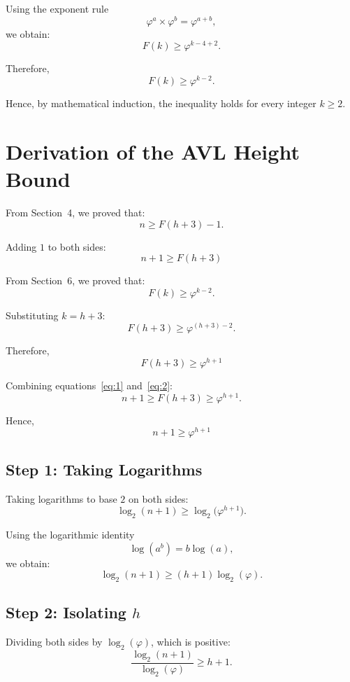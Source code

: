 \documentclass[11pt,a4paper]{article}
\begin{document}
Using the exponent rule
\[
  \varphi^{a} \times \varphi^{b} = \varphi^{a+b},
\]
we obtain:
\[
  F(k) \ge \varphi^{k-4+2}.
\]

Therefore,
\[
  \boxed{F(k) \ge \varphi^{k-2}.}
\]

Hence, by mathematical induction, the inequality holds for every integer $k \ge 2$.

\section{Derivation of the AVL Height Bound}

From Section~4, we proved that:
\[
  n \ge F(h+3) - 1.
\]

Adding $1$ to both sides:
\begin{equation}\label{eq:1}
  \boxed{n + 1 \ge F(h+3)}
\end{equation}

From Section~6, we proved that:
\[
  F(k) \ge \varphi^{k-2}.
\]

Substituting $k = h+3$:
\[
  F(h+3) \ge \varphi^{(h+3)-2}.
\]

Therefore,
\begin{equation}\label{eq:2}
  \boxed{F(h+3) \ge \varphi^{h+1}}
\end{equation}

Combining equations~\eqref{eq:1} and~\eqref{eq:2}:
\[
  n + 1 \ge F(h+3) \ge \varphi^{h+1}.
\]

Hence,
\begin{equation}\label{eq:3}
  \boxed{n + 1 \ge \varphi^{h+1}}
\end{equation}

\subsection*{Step 1: Taking Logarithms}

Taking logarithms to base $2$ on both sides:
\[
  \log_2(n+1) \ge \log_2\!\bigl(\varphi^{h+1}\bigr).
\]

Using the logarithmic identity
\[
  \log(a^b) = b\log(a),
\]
we obtain:
\[
  \log_2(n+1) \ge (h+1)\log_2(\varphi).
\]

\subsection*{Step 2: Isolating $h$}

Dividing both sides by $\log_2(\varphi)$, which is positive:
\[
  \frac{\log_2(n+1)}{\log_2(\varphi)} \ge h+1.
\]
\end{document}
